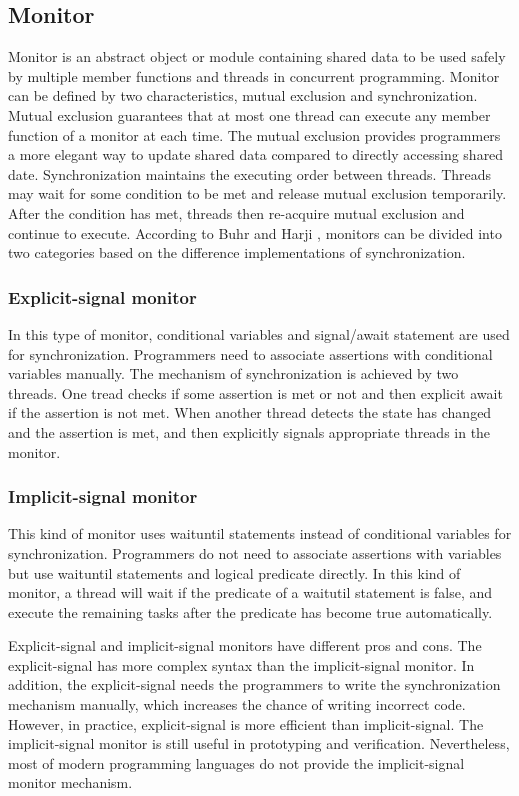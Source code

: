 \documentclass[preprint]{sigplanconf}
\begin{document}
\subsection{Monitor}
Monitor is an abstract object or module containing shared data to be used safely
by multiple member functions and threads in concurrent programming. Monitor can
be defined by two characteristics, mutual exclusion and synchronization. Mutual 
exclusion guarantees that at most one thread can execute any member function of 
a monitor at each time. The mutual exclusion provides programmers a more elegant
way to update shared data compared to directly accessing shared date. 
Synchronization maintains the executing order between threads. Threads may wait
for some condition to be met and release mutual exclusion temporarily. After the
condition has met, threads then re-acquire mutual exclusion and continue to 
execute.
According to Buhr and Harji \cite{bh05}, monitors can be divided into two 
categories based on the difference implementations of synchronization. 
  \subsubsection{Explicit-signal monitor} In this type of monitor, conditional
    variables
    and signal/await statement are used for synchronization. Programmers need to
    associate assertions with conditional variables manually. The mechanism of
    synchronization is achieved by two threads. One tread checks if some
    assertion is met or not and then explicit await if the assertion is not
    met. When another thread detects the state has changed and the assertion is
    met, and then explicitly signals appropriate threads in the monitor.
  \subsubsection{Implicit-signal monitor} This kind of monitor uses waituntil
    statements instead of conditional variables for
    synchronization. Programmers do not need to associate assertions with
    variables but use waituntil statements and logical predicate directly. In
    this kind of monitor, a thread will wait if the predicate of a waitutil
    statement is false, and execute the remaining tasks after the predicate
    has become true automatically.

Explicit-signal and implicit-signal monitors have different pros and cons. The 
explicit-signal has more complex syntax than the implicit-signal monitor. In 
addition, the explicit-signal needs the programmers to write the synchronization
mechanism manually, which increases the chance of writing incorrect code. 
However, in practice, explicit-signal is more efficient than implicit-signal. 
The implicit-signal monitor is still useful in prototyping and verification. 
Nevertheless, most of modern programming languages do not provide the 
implicit-signal monitor mechanism.
\end{document}
